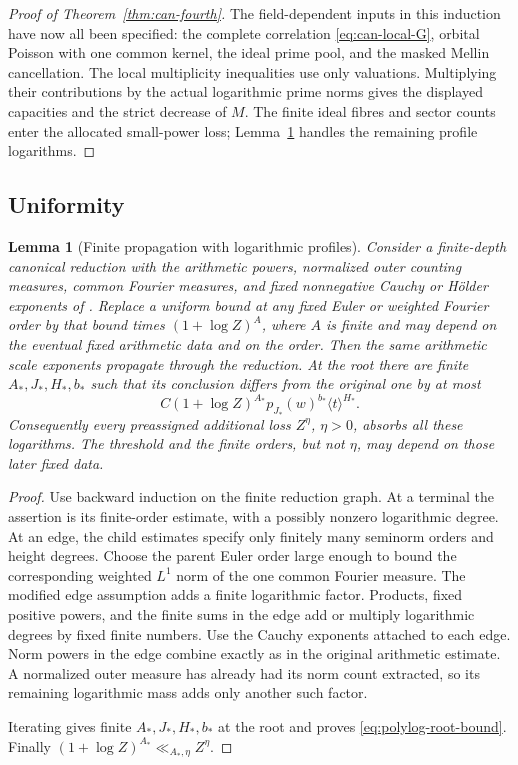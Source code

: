 \documentclass[11pt,a4paper]{article}
\numberwithin{equation}{section}
\newtheorem{lemma}[theorem]{Lemma}
\theoremstyle{definition}
\theoremstyle{remark}
\begin{document}
\begin{proof}[Proof of Theorem~\ref{thm:can-fourth}]
The field-dependent inputs in this induction have now all been
specified: the complete correlation \eqref{eq:can-local-G}, orbital
Poisson with one common kernel, the ideal prime pool, and the masked
Mellin cancellation. The local multiplicity inequalities use only
valuations. Multiplying their contributions by the actual logarithmic
prime norms gives the displayed capacities and the strict decrease of
$M$. The finite ideal fibres and sector counts enter the allocated
small-power loss; Lemma~\ref{lem:polylog-propagation} handles the
remaining profile logarithms.
\end{proof}

\subsection{Uniformity}

\begin{lemma}[Finite propagation with logarithmic profiles]\label{lem:polylog-propagation}
Consider a finite-depth canonical reduction with the arithmetic
powers, normalized outer counting measures, common Fourier measures,
and fixed nonnegative Cauchy or H\"older exponents of
\cite[Lemma 17.3 and Corollary 17.4]{Q}.
Replace a uniform bound at any fixed Euler or weighted Fourier order
by that bound times $(1+\log Z)^A$, where $A$ is finite and may
depend on the eventual fixed arithmetic data and on the order.
Then the same arithmetic scale exponents propagate through the
reduction.  At the root there are finite $A_*,J_*,H_*,b_*$ such that
its conclusion differs from the original one by at most
\begin{equation}\label{eq:polylog-root-bound}
 C(1+\log Z)^{A_*}p_{J_*}(w)^{b_*}\langle t\rangle^{H_*}.
\end{equation}
Consequently every preassigned additional loss $Z^\eta$, $\eta>0$,
absorbs all these logarithms.  The threshold and the finite orders,
but not $\eta$, may depend on those later fixed data.
\end{lemma}
\begin{proof}
Use backward induction on the finite reduction graph.
At a terminal the assertion is its finite-order estimate, with a
possibly nonzero logarithmic degree.  At an edge, the child estimates
specify only finitely many seminorm orders and height degrees.
Choose the parent Euler order large enough to bound the corresponding
weighted $L^1$ norm of the one common Fourier measure.  The modified
edge assumption adds a finite logarithmic factor.  Products,
fixed positive powers, and the finite sums in the edge add or
multiply logarithmic degrees by fixed finite numbers.  Use the Cauchy exponents attached to each edge.  Norm powers in the edge combine
exactly as in the original arithmetic estimate.  A normalized outer
measure has already had its norm count extracted, so its remaining
logarithmic mass adds only another such factor.

Iterating gives finite $A_*,J_*,H_*,b_*$ at the root and proves
\eqref{eq:polylog-root-bound}.  Finally
$(1+\log Z)^{A_*}\ll_{A_*,\eta}Z^\eta$.

\end{proof}
\end{document}
